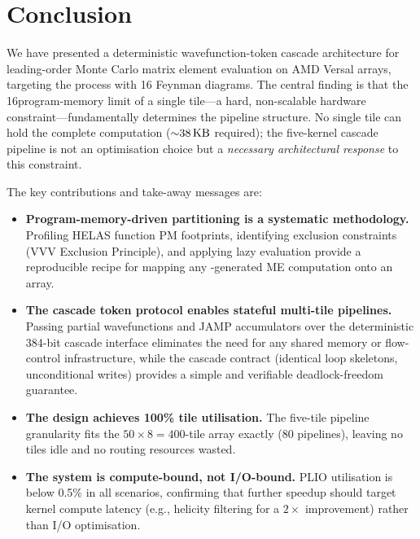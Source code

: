 
\section{Conclusion}\label{sec:conclusion}

We have presented a deterministic wavefunction-token cascade architecture for
leading-order Monte Carlo matrix element evaluation on AMD Versal \aie arrays,
targeting the \ggttg process with 16 Feynman diagrams.  The central finding is
that the 16\KB program-memory limit of a single \aie tile---a hard, non-scalable
hardware constraint---fundamentally determines the pipeline structure.  No
single tile can hold the complete \ggttg computation (${\sim}38\,\text{KB}$ required);
the five-kernel cascade pipeline is not an optimisation choice but a
\emph{necessary architectural response} to this constraint.

The key contributions and take-away messages are:

\begin{itemize}

  \item \textbf{Program-memory-driven partitioning is a systematic
    methodology.}  Profiling HELAS function PM footprints, identifying
    exclusion constraints (VVV Exclusion Principle), and applying lazy
    evaluation provide a reproducible recipe for mapping any
    \mgfive-generated ME computation onto an \aie array.

  \item \textbf{The cascade token protocol enables stateful multi-tile
    pipelines.}  Passing partial wavefunctions and JAMP accumulators over the
    deterministic 384-bit cascade interface eliminates the need for any
    shared memory or flow-control infrastructure, while the cascade contract
    (identical loop skeletons, unconditional writes) provides a simple and
    verifiable deadlock-freedom guarantee.

  \item \textbf{The design achieves 100\% tile utilisation.}  The five-tile
    pipeline granularity fits the $50\times 8 = 400$-tile array exactly (80
    pipelines), leaving no tiles idle and no routing resources wasted.

  \item \textbf{The system is compute-bound, not I/O-bound.}  PLIO utilisation
    is below 0.5\% in all scenarios, confirming that further speedup should
    target kernel compute latency (e.g., helicity filtering for a $2\times$
    improvement) rather than I/O optimisation.

\end{itemize}

